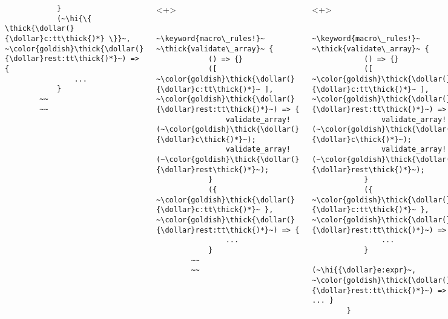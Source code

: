 \documentclass[usepdftitle=false]{beamer}
\newcommand{\dollar}{\makebox[\widthof{\$}][c]{\$}}
\newcommand{\thick}[1]{\contourlength{0.16pt}\contour[10]{black}{#1}}
\newcommand{\hi}[1]{%
\tikz[baseline=(A.base)]
 \node[highlighting=yellowbg,inner sep=0pt,text depth=0pt] (A) {#1};%
}
\newcommand{\keyword}[1]{\color{greenish}#1}
\begin{document}
\begin{frame}[fragile]
\begin{columns}
\begin{onlyenv}
\begin{verbatim}
            }
            (~\hi{\{ \thick{\dollar(}{\dollar}c:tt\thick{)*} \}}~, ~\color{goldish}\thick{\dollar(}{\dollar}rest:tt\thick{)*}~) => {
                ...
            }
        ~~
        ~~
      \end{verbatim}
    \end{onlyenv}
    \begin{onlyenv}<+>
      \begin{verbatim}
        ~\keyword{macro\_rules!}~ ~\thick{validate\_array}~ {
            () => {}
            ([ ~\color{goldish}\thick{\dollar(}{\dollar}c:tt\thick{)*}~ ], ~\color{goldish}\thick{\dollar(}{\dollar}rest:tt\thick{)*}~) => {
                validate_array!(~\color{goldish}\thick{\dollar(}{\dollar}c\thick{)*}~);
                validate_array!(~\color{goldish}\thick{\dollar(}{\dollar}rest\thick{)*}~);
            }
            ({ ~\color{goldish}\thick{\dollar(}{\dollar}c:tt\thick{)*}~ }, ~\color{goldish}\thick{\dollar(}{\dollar}rest:tt\thick{)*}~) => {
                ...
            }
        ~~
        ~~
      \end{verbatim}
    \end{onlyenv}
    \begin{onlyenv}<+>
      \begin{verbatim}
        ~\keyword{macro\_rules!}~ ~\thick{validate\_array}~ {
            () => {}
            ([ ~\color{goldish}\thick{\dollar(}{\dollar}c:tt\thick{)*}~ ], ~\color{goldish}\thick{\dollar(}{\dollar}rest:tt\thick{)*}~) => {
                validate_array!(~\color{goldish}\thick{\dollar(}{\dollar}c\thick{)*}~);
                validate_array!(~\color{goldish}\thick{\dollar(}{\dollar}rest\thick{)*}~);
            }
            ({ ~\color{goldish}\thick{\dollar(}{\dollar}c:tt\thick{)*}~ }, ~\color{goldish}\thick{\dollar(}{\dollar}rest:tt\thick{)*}~) => {
                ...
            }
            (~\hi{{\dollar}e:expr}~, ~\color{goldish}\thick{\dollar(}{\dollar}rest:tt\thick{)*}~) => { ... }
        }
      \end{verbatim}
    \end{onlyenv}
    \begin{onlyenv}<+>
      \begin{verbatim}
        ~\keyword{macro\_rules!}~ ~\thick{validate\_array}~ {
            () => {}
            ([ ~\color{goldish}\thick{\dollar(}{\dollar}c:tt\thick{)*}~ ], ~\color{goldish}\thick{\dollar(}{\dollar}rest:tt\thick{)*}~) => {
                validate_array!(~\color{goldish}\thick{\dollar(}{\dollar}c\thick{)*}~);
                validate_array!(~\color{goldish}\thick{\dollar(}{\dollar}rest\thick{)*}~);
            }
            ({ ~\color{goldish}\thick{\dollar(}{\dollar}c:tt\thick{)*}~ }, ~\color{goldish}\thick{\dollar(}{\dollar}rest:tt\thick{)*}~) => {
                ...
            }
            (~\color{goldish}{\dollar}e:expr~, ~\color{goldish}\thick{\dollar(}{\dollar}rest:tt\thick{)*}~) => { ... }
        }
      \end{verbatim}
    \end{onlyenv}
  \end{columns}
\end{frame}
\end{document}
